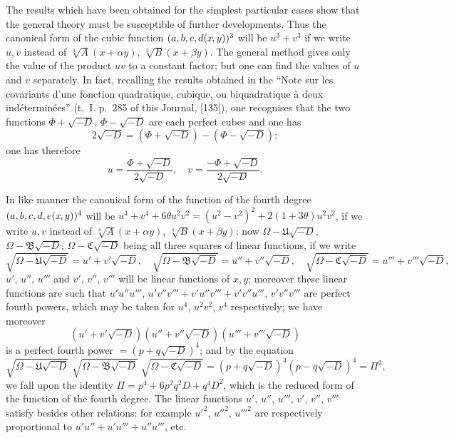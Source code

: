 \documentclass[11pt,a4paper]{article}
\newcommand{\fxn}[2]{(#1\kern-1pt, #2)}
\begin{document}
The results which have been obtained for the simplest particular cases show that the general theory must be susceptible of further developments. Thus the canonical form of the cubic function $(a,b,c,d\,\!\fxn{x}{y})^3$ will be $u^3+v^3$ if we write $u,v$ instead of $\sqrt[3]{A}(x+\alpha y)$, $\sqrt[3]{B}(x+\beta y)$. The general method gives only the value of the product $uv$ to a constant factor; but one can find the values of $u$ and $v$ separately. In fact, recalling the results obtained in the ``Note sur les covariants d'une fonction quadratique, cubique, ou biquadratique à deux indéterminées'' (t.~I. p.~285 of this Journal, [135]), one recognises that the two functions $\Phi+\sqrt{-D}$, $\Phi-\sqrt{-D}$ are each perfect cubes and one has
\[
2\sqrt{-D} = (\Phi+\sqrt{-D}) - (\Phi-\sqrt{-D});
\]
one has therefore
\[
u = \frac{\Phi+\sqrt{-D}}{2\sqrt{-D}}, \quad v = \frac{-\Phi+\sqrt{-D}}{2\sqrt{-D}}.
\]

In like manner the canonical form of the function of the fourth degree $(a,b,c,d,e\,\!\fxn{x}{y})^4$ will be $u^4+v^4+6\theta u^2v^2 = (u^2-v^2)^2+2(1+3\theta)u^2v^2$, if we write $u,v$ instead of $\sqrt[4]{A}(x+\alpha y)$, $\sqrt[4]{B}(x+\beta y)$; now $\Omega-\mathfrak{U}\sqrt{-D}$, $\Omega-\mathfrak{B}\sqrt{-D}$, $\Omega-\mathfrak{C}\sqrt{-D}$ being all three squares of linear functions, if we write
\[
\sqrt{\Omega-\mathfrak{U}\sqrt{-D}} = u'+v'\sqrt{-D}, \quad
\sqrt{\Omega-\mathfrak{B}\sqrt{-D}} = u''+v''\sqrt{-D}, \quad
\sqrt{\Omega-\mathfrak{C}\sqrt{-D}} = u'''+v'''\sqrt{-D},
\]
$u'$, $u''$, $u'''$ and $v'$, $v''$, $v'''$ will be linear functions of $x,y$; moreover these linear functions are such that $u'u''u'''$, $u'v''v'''+v'u''v'''+v'v''u'''$, $v'v''v'''$ are perfect fourth powers, which may be taken for $u^4$, $u^2v^2$, $v^4$ respectively; we have moreover
\[
(u'+v'\sqrt{-D})(u''+v''\sqrt{-D})(u'''+v'''\sqrt{-D})
\]
is a perfect fourth power $= (p+q\sqrt{-D})^4$; and by the equation
\[
\sqrt{\Omega-\mathfrak{U}\sqrt{-D}} \; \sqrt{\Omega-\mathfrak{B}\sqrt{-D}} \; \sqrt{\Omega-\mathfrak{C}\sqrt{-D}}
= (p+q\sqrt{-D})^4(p-q\sqrt{-D})^4 = \Pi^2,
\]
we fall upon the identity $\Pi=p^4+6p^2q^2D+q^4D^2$, which is the reduced form of the function of the fourth degree. The linear functions $u'$, $u''$, $u'''$, $v'$, $v''$, $v'''$ satisfy besides other relations: for example $u'^2$, $u''^2$, $u'''^2$ are respectively proportional to $u'u''+u'u'''+u''u'''$, etc.
\end{document}
